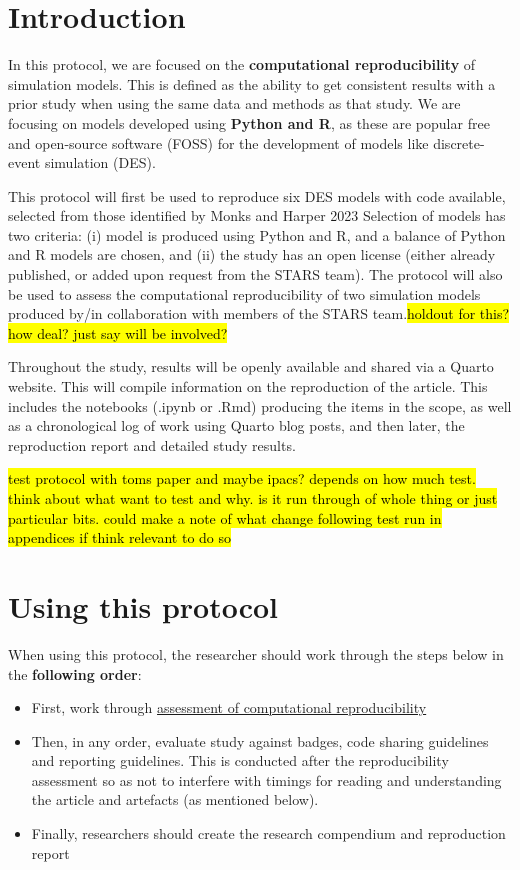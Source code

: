 \section{Introduction}

In this protocol, we are focused on the \textbf{computational reproducibility} of simulation models. This is defined as the ability to get consistent results with a prior study when using  the same data and methods as that study. We are focusing on models developed using \textbf{Python and R}, as these are popular free and open-source software (FOSS) for the development of models like discrete-event simulation (DES).\autocite{monks_computer_2023}

This protocol will first be used to reproduce six DES models with code available, selected from those identified by Monks and Harper 2023\autocite{monks_computer_2023} Selection of models has two criteria: (i) model is produced using Python and R, and a balance of Python and R models are chosen, and (ii) the study has an open license (either already published, or added upon request from the STARS team). The protocol will also be used to assess the computational reproducibility of two simulation models produced by/in collaboration with members of the STARS team.\hl{holdout for this? how deal? just say will be involved?}

Throughout the study, results will be openly available and shared via a Quarto website. This will compile information on the reproduction of the article. This includes the notebooks (.ipynb or .Rmd) producing the items in the scope, as well as a chronological log of work using Quarto blog posts, and then later, the reproduction report and detailed study results.

\hl{test protocol with toms paper and maybe ipacs? depends on how much test. think about what want to test and why. is it run through of whole thing or just particular bits. could make a note of what change following test run in appendices if think relevant to do so}

\vspace{2cm}
\section{Using this protocol}

When using this protocol, the researcher should work through the steps below in the \textbf{following order}:
\begin{itemize}
    \item First, work through \hyperref[sec:reproduce]{assessment of computational reproducibility}
    \item Then, in any order, evaluate study against badges, code sharing guidelines and reporting guidelines. This is conducted after the reproducibility assessment so as not to interfere with timings for reading and understanding the article and artefacts (as mentioned below).
    \item Finally, researchers should create the research compendium and reproduction report
\end{itemize}

